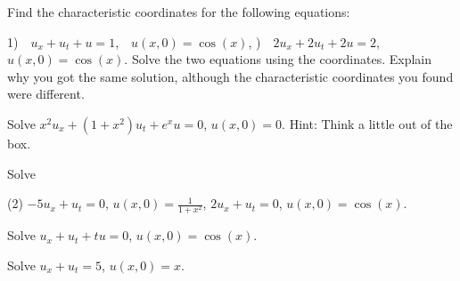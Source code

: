 \begin{exercise}
\leavevmode
\begin{tasks}
\task Find the characteristic coordinates for the
following equations:

1)~~$u_x+u_t + u = 1$,~~$u(x,0) = \cos(x)$,
)~~$2u_x+2u_t +2u = 2$,~~$u(x,0) = \cos(x)$.
\task Solve the two equations using the coordinates.
\task Explain why
you got the same solution, although the characteristic coordinates
you found were different.
\end{tasks}
\end{exercise}

\begin{exercise}
Solve $x^2 u_x + (1+x^2) u_t + e^x u = 0$, $u(x,0) = 0$.
Hint: Think a little out of the box.
\end{exercise}

\setcounter{exercise}{100}

\begin{exercise}
Solve
\begin{tasks}(2)
\task $-5u_x + u_t = 0$, \enspace $u(x,0) = \frac{1}{1+x^2}$,
\task $2u_x + u_t = 0$, \enspace $u(x,0) = \cos(x)$.
\end{tasks}
\end{exercise}

\begin{exercise}
Solve $u_x+u_t+tu = 0$, $u(x,0) = \cos(x)$.
\end{exercise}

\begin{exercise}
Solve $u_x+u_t = 5$, $u(x,0) = x$.
\end{exercise}
